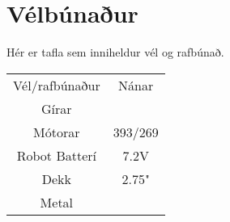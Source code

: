 \section{Vélbúnaður}
Hér er tafla sem inniheldur vél og rafbúnað.

\begin{center}
\begin{tabular}{ |c|c| } 
 \hline
 Vél/rafbúnaður &Nánar \\ 
 Gírar  &\\ 
 Mótorar & 393/269 \\
 Robot Batterí & 7.2V \\
 Dekk & 2.75" \\
 Metal & \\
 \hline
\end{tabular}
\end{center}